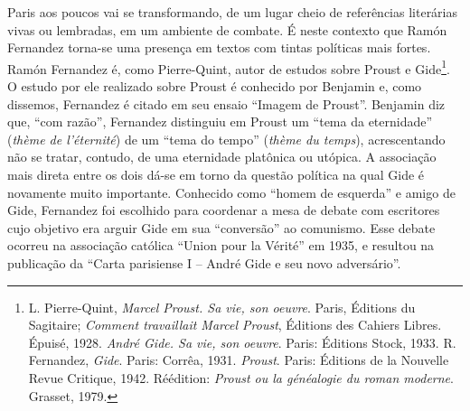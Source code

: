 Paris aos poucos vai se transformando, de um lugar cheio de referências
literárias vivas ou lembradas, em um ambiente de combate. É neste
contexto que Ramón Fernandez torna-se uma presença em textos com tintas
políticas mais fortes. Ramón Fernandez é, como Pierre-Quint, autor de
estudos sobre Proust e Gide\footnote{L. Pierre-Quint, \emph{Marcel
  Proust. Sa vie, son oeuvre}. Paris, Éditions du Sagitaire;
  \emph{Comment travaillait Marcel Proust}, Éditions des Cahiers Libres.
  Épuisé, 1928. \emph{André Gide. Sa vie, son oeuvre}. Paris: Éditions
  Stock, 1933. R. Fernandez, \emph{Gide}. Paris: Corrêa, 1931.
  \emph{Proust}. Paris: Éditions de la Nouvelle Revue Critique, 1942.
  Réédition: \emph{Proust ou la généalogie du roman moderne}. Grasset,
  1979.}. O estudo por ele realizado sobre Proust é conhecido por
Benjamin e, como dissemos, Fernandez é citado em seu ensaio ``Imagem de
Proust''. Benjamin diz que, ``com razão'', Fernandez distinguiu em
Proust um ``tema da eternidade'' (\emph{thème de l'éternité}) de um
``tema do tempo'' (\emph{thème du temps}), acrescentando não se tratar,
contudo, de uma eternidade platônica ou utópica. A associação mais
direta entre os dois dá-se em torno da questão política na qual Gide é
novamente muito importante. Conhecido como ``homem de esquerda'' e amigo
de Gide, Fernandez foi escolhido para coordenar a mesa de debate com
escritores cujo objetivo era arguir Gide em sua ``conversão'' ao
comunismo. Esse debate ocorreu na associação católica ``Union pour la
Vérité'' em 1935, e resultou na publicação da ``Carta parisiense I --
André Gide e seu novo adversário''.

